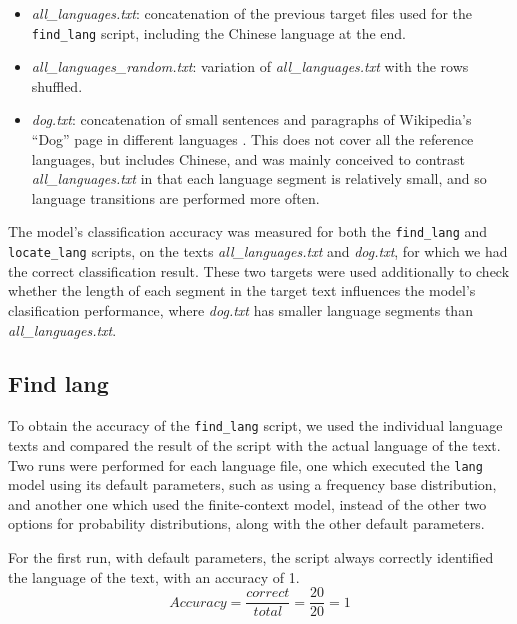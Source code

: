 \documentclass{article}
\begin{document}
\begin{itemize}
    \item \textit{all\_languages.txt}: concatenation of the previous target files used for the \texttt{find\_lang} script, including the Chinese language at the end.
    \item \textit{all\_languages\_random.txt}: variation of \textit{all\_languages.txt} with the rows shuffled.
    \item \textit{dog.txt}: concatenation of small sentences and paragraphs of Wikipedia's ``Dog'' page in different languages \cite{wiki:dog}. This does not cover all the reference languages, but includes Chinese, and was mainly conceived to contrast \textit{all\_languages.txt} in that each language segment is relatively small, and so language transitions are performed more often.
\end{itemize}

The model's classification accuracy was measured for both the \texttt{find\_lang} and \texttt{locate\_lang} scripts, on the texts \textit{all\_languages.txt} and \textit{dog.txt}, for which we had the correct classification result.
These two targets were used additionally to check whether the length of each segment in the target text influences the model's clasification performance, where \textit{dog.txt} has smaller language segments than \textit{all\_languages.txt}.

\subsection{Find lang}
\label{subsec:results_find_lang}

To obtain the accuracy of the \texttt{find\_lang} script, we used the individual language texts and compared the result of the script with the actual language of the text.
Two runs were performed for each language file, one which executed the \texttt{lang} model using its default parameters, such as using a frequency base distribution,
and another one which used the finite-context model, instead of the other two options for probability distributions, along with the other default parameters.

For the first run, with default parameters, the script always correctly identified the language of the text, with an accuracy of 1.
\begin{equation}
    \label{eq:find_lang_default_accuracy}
    Accuracy = \frac{correct}{total} = \frac{20}{20} = 1
\end{equation}
\end{document}
